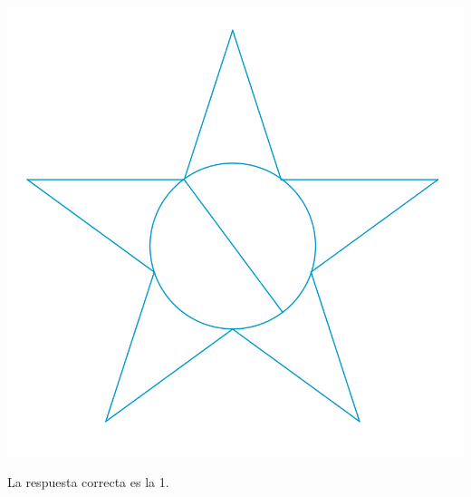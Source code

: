 \documentclass[11pt, a4paper]{article} %
\theoremstyle{dotlessP}
\theoremstyle{dotlessS}
\begin{document}
\begin{enumerate}[label=\color{dg}\theenumi.]
  \begin{center}
  		\includegraphics[scale=1]{SerBachiller143_fig2}
  \end{center}
  

  
  
  {\color{dh} La respuesta correcta es la 1.}
   
\end{enumerate}
\end{document}
